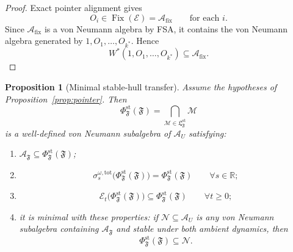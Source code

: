 \documentclass[12pt]{article}
\newtheorem{proposition}[theorem]{Proposition}
\theoremstyle{definition}
\theoremstyle{remark}
\begin{document}
\begin{proof}
Exact pointer alignment gives
\[
O_i\in \operatorname{Fix}(\mathcal E)=\mathcal A_{\mathrm{fix}}
\qquad
\text{for each } i.
\]
Since \(\mathcal A_{\mathrm{fix}}\) is a von Neumann algebra by FSA, it
contains the von Neumann algebra generated by \(1,O_1,\dots,O_{k^*}\).
Hence
\[
W^*(1,O_1,\dots,O_{k^*})\subseteq \mathcal A_{\mathrm{fix}}.
\]
\end{proof}

\begin{proposition}[Minimal stable-hull transfer]\label{prop:stablehull}
Assume the hypotheses of Proposition~\ref{prop:pointer}. Then
\[
\Phi_{\mathfrak F}^{\mathrm{st}}(\mathfrak F)
=
\bigcap_{\mathcal M\in \mathfrak L_{\mathfrak F}^{\mathrm{st}}}\mathcal M
\]
is a well-defined von Neumann subalgebra of \(\mathcal A_U\) satisfying:
\begin{enumerate}
\item \(\mathcal A_{\mathfrak F}\subseteq
  \Phi_{\mathfrak F}^{\mathrm{st}}(\mathfrak F)\);
\item
  \[
  \sigma_s^{\omega,\mathrm{tot}}
  \big(\Phi_{\mathfrak F}^{\mathrm{st}}(\mathfrak F)\big)
  =
  \Phi_{\mathfrak F}^{\mathrm{st}}(\mathfrak F)
  \qquad
  \forall s\in\mathbb R;
  \]
\item
  \[
  \mathcal E_t\big(\Phi_{\mathfrak F}^{\mathrm{st}}(\mathfrak F)\big)
  \subseteq
  \Phi_{\mathfrak F}^{\mathrm{st}}(\mathfrak F)
  \qquad
  \forall t\ge 0;
  \]
\item it is minimal with these properties: if
  \(\mathcal N\subseteq\mathcal A_U\) is any von Neumann subalgebra
  containing \(\mathcal A_{\mathfrak F}\) and stable under both ambient
  dynamics, then
  \[
  \Phi_{\mathfrak F}^{\mathrm{st}}(\mathfrak F)\subseteq \mathcal N.
  \]
\end{enumerate}
\end{proposition}
\end{document}
